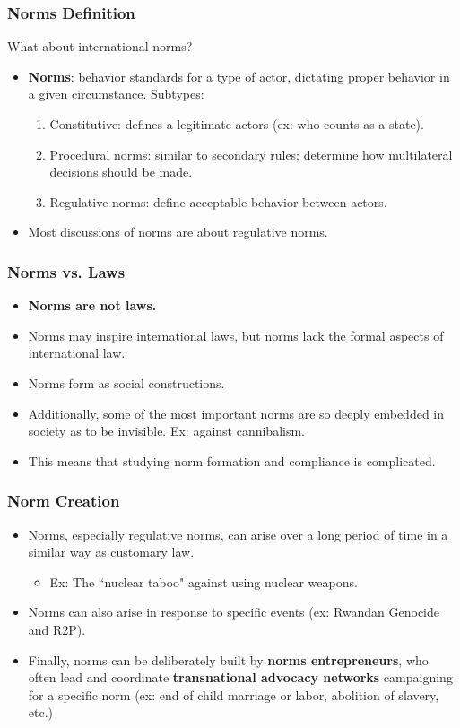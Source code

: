 \documentclass{beamer}
\begin{document}
\begin{frame} 
	\frametitle{\LARGE{Norms Definition}}
	What about international norms? \pause
	\begin{itemize}
		\item \textbf{Norms}: behavior standards for a type of actor, dictating proper behavior in a given circumstance. \pause Subtypes:
		\begin{enumerate}
			\item Constitutive: defines a legitimate actors (ex: who counts as a state). \pause
			\item Procedural norms: similar to secondary rules; determine how multilateral decisions should be made. \pause
			\item Regulative norms: define acceptable behavior between actors. \pause
		\end{enumerate}
	\item Most discussions of norms are about regulative norms.
	\end{itemize}
\end{frame}

\begin{frame} 
	\frametitle{\LARGE{Norms vs. Laws}}
	\begin{itemize}
		\item \textbf{Norms are not laws.} \pause
		\item Norms may inspire international laws, but norms lack the formal aspects of international law. \pause
		\item Norms form as social constructions. \pause
		\item Additionally, some of the most important norms are so deeply embedded in society as to be invisible. \pause Ex: against cannibalism. \pause
		\item This means that studying norm formation and compliance is complicated.		
	\end{itemize}
\end{frame}

\begin{frame} 
	\frametitle{\LARGE{Norm Creation}}
	\begin{itemize}
		\item Norms, especially regulative norms, can arise over a long period of time in a similar way as customary law. \pause
		\begin{itemize}
			\item Ex: The ``nuclear taboo" against using nuclear weapons.
		\end{itemize}
		\item Norms can also arise in response to specific events (ex: Rwandan Genocide and R2P).
		\item Finally, norms can be deliberately built by \textbf{norms entrepreneurs}, who often lead and coordinate \textbf{transnational advocacy networks} campaigning for a specific norm (ex: end of child marriage or labor, abolition of slavery, etc.)
	\end{itemize}
\end{frame}
\end{document}
